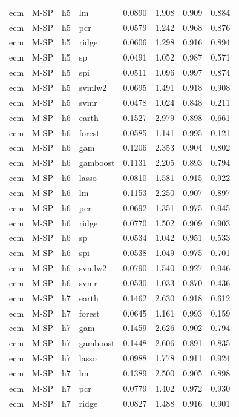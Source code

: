 \begin{ThreePartTable}
\begin{longtable}[t]{llclcccc}
ecm & M-SP & h5 & lm & 0.0890 & 1.908 & 0.909 & 0.884\\
ecm & M-SP & h5 & pcr & 0.0579 & 1.242 & 0.968 & 0.876\\
ecm & M-SP & h5 & ridge & 0.0606 & 1.298 & 0.916 & 0.894\\
ecm & M-SP & h5 & sp & 0.0491 & 1.052 & 0.987 & 0.571\\
ecm & M-SP & h5 & spi & 0.0511 & 1.096 & 0.997 & 0.874\\
ecm & M-SP & h5 & svmlw2 & 0.0695 & 1.491 & 0.918 & 0.908\\
ecm & M-SP & h5 & svmr & 0.0478 & 1.024 & 0.848 & 0.211\\
\addlinespace
ecm & M-SP & h6 & earth & 0.1527 & 2.979 & 0.898 & 0.661\\
ecm & M-SP & h6 & forest & 0.0585 & 1.141 & 0.995 & 0.121\\
ecm & M-SP & h6 & gam & 0.1206 & 2.353 & 0.904 & 0.802\\
ecm & M-SP & h6 & gamboost & 0.1131 & 2.205 & 0.893 & 0.794\\
ecm & M-SP & h6 & lasso & 0.0810 & 1.581 & 0.915 & 0.922\\
ecm & M-SP & h6 & lm & 0.1153 & 2.250 & 0.907 & 0.897\\
ecm & M-SP & h6 & pcr & 0.0692 & 1.351 & 0.975 & 0.945\\
ecm & M-SP & h6 & ridge & 0.0770 & 1.502 & 0.909 & 0.903\\
ecm & M-SP & h6 & sp & 0.0534 & 1.042 & 0.951 & 0.533\\
ecm & M-SP & h6 & spi & 0.0538 & 1.049 & 0.975 & 0.701\\
ecm & M-SP & h6 & svmlw2 & 0.0790 & 1.540 & 0.927 & 0.946\\
ecm & M-SP & h6 & svmr & 0.0530 & 1.033 & 0.870 & 0.436\\
\addlinespace
ecm & M-SP & h7 & earth & 0.1462 & 2.630 & 0.918 & 0.612\\
ecm & M-SP & h7 & forest & 0.0645 & 1.161 & 0.993 & 0.159\\
ecm & M-SP & h7 & gam & 0.1459 & 2.626 & 0.902 & 0.794\\
ecm & M-SP & h7 & gamboost & 0.1448 & 2.606 & 0.891 & 0.835\\
ecm & M-SP & h7 & lasso & 0.0988 & 1.778 & 0.911 & 0.924\\
ecm & M-SP & h7 & lm & 0.1389 & 2.500 & 0.905 & 0.898\\
ecm & M-SP & h7 & pcr & 0.0779 & 1.402 & 0.972 & 0.930\\
ecm & M-SP & h7 & ridge & 0.0827 & 1.488 & 0.916 & 0.901\\

\end{longtable}
\end{ThreePartTable}
